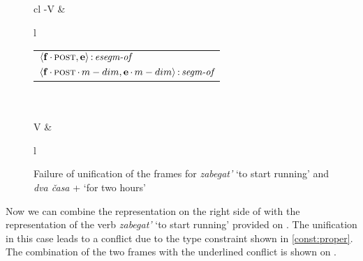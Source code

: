 \begin{figure}
\hfill
\begin{tabular}[t]{cl}
-V &
\begin{tabular}[t]{l}
\\
\end{tabular}
\begin{footnotesize}
\begin{tabular}[t]{l}
$\langle{\textbf{\textrm{f}}\,{\cdot}\,\textsc{post},\textbf{\textrm{e}}}\rangle\,{:}\,\textit{esegm-of}$\\[1ex]
$\tuple{\btag{f}\BC\POST\C\MDIM,\btag{e}\BC\MDIM}\D\type{segm-of}$\\
\end{tabular}
\end{footnotesize}
\\\\
V &
\begin{tabular}[t]{l}
\\
\end{tabular}
\end{tabular}
\hfill
\caption{Failure of unification of the frames for \textit{zabegat'} `to start running' and \textit{dva \v{c}asa}  + `for two hours'}
\label{frame:zabegat:2hours}
\end{figure}

Now we can combine the representation on the right side of  with the representation of the verb \textit{zabegat'} `to start running' provided on . The unification in this case leads to a conflict due to the type constraint shown in \ref{const:proper}. The combination of the two frames with the underlined conflict is shown on . 

